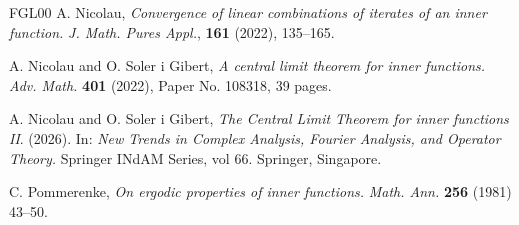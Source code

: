 \documentclass[11pt, reqno]{amsart}
\theoremstyle{definition}
\newtheorem*{Brown-Eagleson Theorem}{The Brown-Eagleson Theorem}
\begin{document}
\begin{thebibliography}{FGL00}
		A. Nicolau, \emph{Convergence of linear combinations of iterates of an inner function.} {\sl J. Math. Pures Appl.}, {\bf 161} (2022), 135--165.
		

		A. Nicolau and O. Soler i Gibert, \emph{A central limit theorem for inner functions.} {\sl Adv. Math.} {\bf 401} (2022), Paper No. 108318, 39 pages.

		A. Nicolau and O. Soler i Gibert, \emph{The Central Limit Theorem for inner functions II}. (2026). In: {\sl New Trends in Complex Analysis, Fourier Analysis, and Operator Theory.} Springer INdAM Series, vol 66. Springer, Singapore.

		C. Pommerenke, \emph{On ergodic properties of inner functions.} {\sl Math. Ann.} {\bf 256} (1981) 43--50.

		
		
		

		
		
	\end{thebibliography}
	
	
	
	
	
	
	
	
\end{document}
